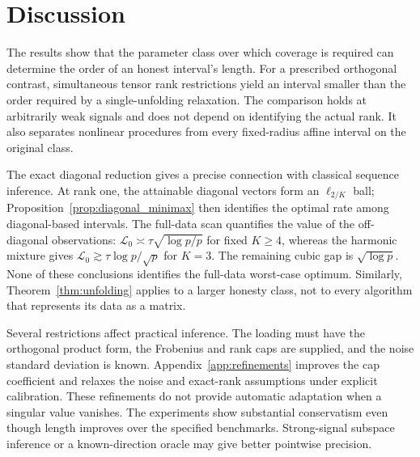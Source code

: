 \documentclass[11pt]{article}
\theoremstyle{remark}
\begin{document}
\begin{table}[ht]
\centering

\caption{Noise-assumption stress at $A=0$, $K=3$, $p=n=512$, cap one and nominal level 0.95. Only the first row belongs to the stated iid Gaussian model. These results delimit the calibration; they do not support a robustness claim.}
\label{tab:stress}
\end{table}

\section{Discussion}\label{sec:discussion}

The results show that the parameter class over which coverage is required can determine the order of an honest interval's length. For a prescribed orthogonal contrast, simultaneous tensor rank restrictions yield an interval smaller than the order required by a single-unfolding relaxation. The comparison holds at arbitrarily weak signals and does not depend on identifying the actual rank. It also separates nonlinear procedures from every fixed-radius affine interval on the original class.

The exact diagonal reduction gives a precise connection with classical sequence inference. At rank one, the attainable diagonal vectors form an $\ell_{2/K}$ ball; Proposition~\ref{prop:diagonal_minimax} then identifies the optimal rate among diagonal-based intervals. The full-data scan quantifies the value of the off-diagonal observations: $\mathcal L_0\asymp\tau\sqrt{\log p/p}$ for fixed $K\ge4$, whereas the harmonic mixture gives $\mathcal L_0\gtrsim\tau\log p/\sqrt p$ for $K=3$. The remaining cubic gap is $\sqrt{\log p}$. None of these conclusions identifies the full-data worst-case optimum. Similarly, Theorem~\ref{thm:unfolding} applies to a larger honesty class, not to every algorithm that represents its data as a matrix.

Several restrictions affect practical inference. The loading must have the orthogonal product form, the Frobenius and rank caps are supplied, and the noise standard deviation is known. Appendix~\ref{app:refinements} improves the cap coefficient and relaxes the noise and exact-rank assumptions under explicit calibration. These refinements do not provide automatic adaptation when a singular value vanishes. The experiments show substantial conservatism even though length improves over the specified benchmarks. Strong-signal subspace inference or a known-direction oracle may give better pointwise precision.
\end{document}
